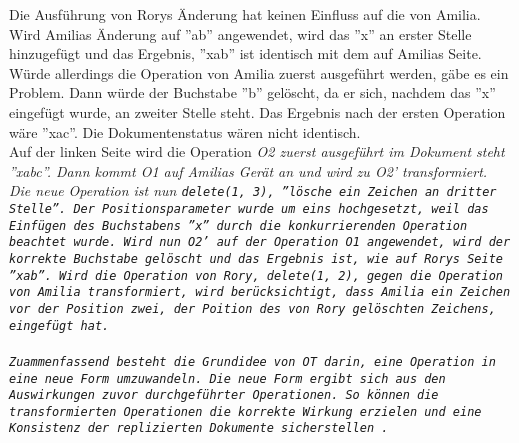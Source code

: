 Die Ausführung von Rorys Änderung hat keinen Einfluss auf die von Amilia.
Wird Amilias Änderung auf ''ab'' angewendet, wird das ''x'' an erster Stelle hinzugefügt und das Ergebnis, ''xab'' ist identisch mit dem auf Amilias Seite.\\
%
Würde allerdings die Operation von Amilia zuerst ausgeführt werden, gäbe es ein Problem.
Dann würde der Buchstabe ''b'' gelöscht, da er sich, nachdem das ''x'' eingefügt wurde, an zweiter Stelle steht.
Das Ergebnis nach der ersten Operation wäre ''xac''. Die Dokumentenstatus wären nicht identisch.\\
%
Auf der linken Seite wird die Operation \it{O2} zuerst ausgeführt im Dokument steht ''xabc''.
Dann kommt \it{O1} auf Amilias Gerät an und wird zu \it{O2'} transformiert. Die neue Operation ist nun \tt{delete(1, 3)}, ''lösche ein Zeichen an dritter Stelle''. Der Positionsparameter wurde um eins hochgesetzt, weil das Einfügen des Buchstabens ''x'' durch die konkurrierenden Operation beachtet wurde.
Wird nun \it{O2'} auf der Operation \it{O1} angewendet, wird der korrekte Buchstabe gelöscht und das Ergebnis ist, wie auf Rorys Seite ''xab''.
Wird die Operation von Rory, \tt{delete(1, 2)}, gegen die Operation von Amilia transformiert, wird berücksichtigt, dass Amilia ein Zeichen vor der Position zwei, der Poition des von Rory gelöschten Zeichens, eingefügt hat.\\\\
%
%
Zuammenfassend besteht die Grundidee von \gls{OT} darin, eine Operation in eine neue Form umzuwandeln.
Die neue Form ergibt sich aus den Auswirkungen zuvor durchgeführter Operationen.
So können die transformierten Operationen die korrekte Wirkung erzielen und eine Konsistenz der replizierten Dokumente sicherstellen~\cite{ot-later}.
%
%
